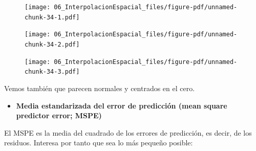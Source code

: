 \documentclass[
  letterpaper,
  DIV=11,
  numbers=noendperiod]{scrreprt}
\newenvironment{Shaded}{\begin{snugshade}}{\end{snugshade}}
\newcommand{\AttributeTok}[1]{\textcolor[rgb]{0.40,0.45,0.13}{#1}}
\newcommand{\CommentTok}[1]{\textcolor[rgb]{0.37,0.37,0.37}{#1}}
\newcommand{\DecValTok}[1]{\textcolor[rgb]{0.68,0.00,0.00}{#1}}
\newcommand{\FunctionTok}[1]{\textcolor[rgb]{0.28,0.35,0.67}{#1}}
\newcommand{\NormalTok}[1]{\textcolor[rgb]{0.00,0.23,0.31}{#1}}
\newcommand{\SpecialCharTok}[1]{\textcolor[rgb]{0.37,0.37,0.37}{#1}}
\newcommand{\StringTok}[1]{\textcolor[rgb]{0.13,0.47,0.30}{#1}}
\providecommand{\tightlist}{%
  \setlength{\itemsep}{0pt}\setlength{\parskip}{0pt}}\usepackage{longtable,booktabs,array}
\begin{document}
\begin{figure}[H]

{\centering \texttt{[image: 06\_InterpolacionEspacial\_files/figure-pdf/unnamed-chunk-34-1.pdf]}

}

\end{figure}

\begin{Shaded}
\end{Shaded}

\begin{figure}[H]

{\centering \texttt{[image: 06\_InterpolacionEspacial\_files/figure-pdf/unnamed-chunk-34-2.pdf]}

}

\end{figure}

\begin{Shaded}
\end{Shaded}

\begin{figure}[H]

{\centering \texttt{[image: 06\_InterpolacionEspacial\_files/figure-pdf/unnamed-chunk-34-3.pdf]}

}

\end{figure}

Vemos también que parecen normales y centrados en el cero.

\begin{itemize}
\tightlist
\item
  \textbf{Media estandarizada del error de predicción (mean square
  predictor error; MSPE)}
\end{itemize}

El MSPE es la media del cuadrado de los errores de predicción, es decir,
de los residuos. Interesa por tanto que sea lo más pequeño posible:

\begin{Shaded}
\end{Shaded}
\end{document}
